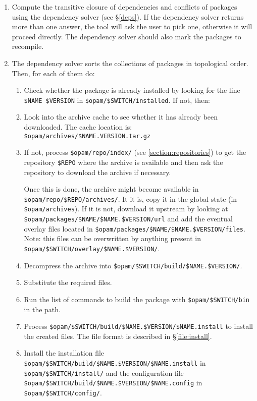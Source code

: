 \documentclass[a4paper,10pt]{article}
\begin{document}
\begin{enumerate}

\item Compute the transitive closure of dependencies and conflicts of
  packages using the dependency solver (see \S\ref{deps}). If the
  dependency solver returns more than one answer, the tool will ask
  the user to pick one, otherwise it will proceed directly. The
  dependency solver should also mark the packages to recompile.

\item The dependency solver sorts the collections of packages in
  topological order. Then, for each of them do:

\begin{enumerate}

\item Check whether the package is already installed by looking for
  the line \verb+$NAME $VERSION+ in \verb+$opam/$SWITCH/installed+.
  If not, then:

\item Look into the archive cache to see whether it has already been
  downloaded. The cache location is:
  \verb+$opam/archives/$NAME.VERSION.tar.gz+

\item If not, process \verb+$opam/repo/index/+ (see
  \ref{section:repositories}) to get the repository
  \verb+$REPO+ where the archive is available and then ask the
  repository to download the archive if necessary.

  Once this is done, the archive might become available in
  \verb+$opam/repo/$REPO/archives/+. It it is, copy it in the global
  state (in \verb+$opam/archives+). If it is not, download it upstream
  by looking at \verb|$opam/packages/$NAME/$NAME.$VERSION/url| and add
  the eventual overlay files located in
  \verb|$opam/packages/$NAME/$NAME.$VERSION/files|. Note: this files
  can be overwritten by anything present in
  \verb|$opam/$SWITCH/overlay/$NAME.$VERSION/|.

\item Decompress the archive into \verb+$opam/$SWITCH/build/$NAME.$VERSION/+.

\item Substitute the required files.

\item Run the list of commands to build the package with \verb+$opam/$SWITCH/bin+
  in the path.

\item Process \verb+$opam/$SWITCH/build/$NAME.$VERSION/$NAME.install+ to install
  the created files. The file format is described in \S\ref{file:install}.

\item Install the installation file
  \verb+$opam/$SWITCH/build/$NAME.$VERSION/$NAME.install+ in
  \verb+$opam/$SWITCH/install/+ and the configuration file
  \verb+$opam/$SWITCH/build/$NAME.$VERSION/$NAME.config+ in
  \verb+$opam/$SWITCH/config/+.

\end{enumerate}
\end{enumerate}
\end{document}
